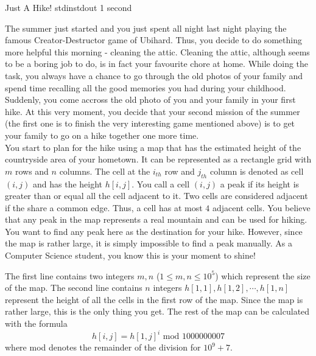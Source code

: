 
\begin{problem}{Just A Hike!}
{stdin}{stdout}
{1 second}{}{}

The summer just started and you just spent all night last night playing the famous Creator-Destructor game of Ubihard. 
Thus, you decide to do something more helpful this morning - cleaning the attic. Cleaning the attic, although seems to be
a boring job to do, is in fact your favourite chore at home. While doing the task, you always have a chance to go through 
the old photos of your family and spend time recalling all the good memories you had during your childhood. Suddenly, you 
come accross the old photo of you and your family in your first hike. At this very moment, you decide that your second
mission of the summer (the first one is to finish the very interesting game mentioned above) is to get your family to go
on a hike together one more time.\\

You start to plan for the hike using a map that has the estimated height of the countryside area of your hometown. It can be 
represented as a rectangle grid with $m$ rows and $n$ columns. The cell at the $i_{th}$ row and $j_{th}$ column is denoted 
as cell $(i, j)$ and has the height $h[i, j]$. You call a cell $(i, j)$ a peak if its height is greater than or equal all 
the cell adjacent to it. Two cells are considered adjacent if the share a common edge. Thus, a cell has at most $4$ adjacent 
cells. You believe that any peak in the map represents a real mountain and can be used for hiking. You want to find any peak 
here as the destination for your hike. However, since the map is rather large, it is simply impossible to find a peak manually.
As a Computer Science student, you know this is your moment to shine!

\InputFile

The first line contains two integers $m, n$ ($1 \leq m, n \leq 10^5$) which represent the size of the map. The second line
contains $n$ integers $h[1, 1], h[1, 2], \cdots, h[1, n]$ represent the height of all the cells in the first row of the
map. Since the map is rather large, this is the only thing you get. The rest of the map can be calculated with the formula
    \begin{equation}
       h[i, j] = h[1, j]^i \text{ mod } 1000000007
    \end{equation}
where mod denotes the remainder of the division for $10^9 + 7$.


\end{problem}
